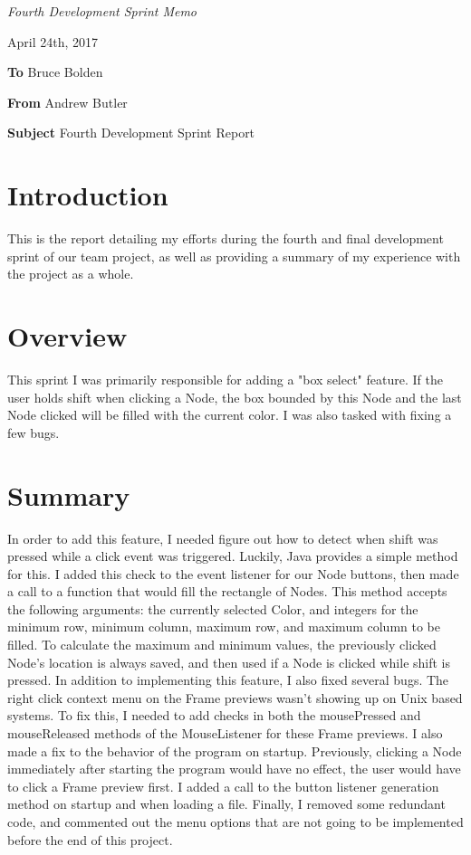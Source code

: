 \documentclass[12pt]{article}
\begin{document}
\noindent \emph {Fourth Development Sprint Memo}

\hfill April 24th, 2017

\noindent \textbf {To} \hspace{32pt}Bruce Bolden

\noindent \textbf {From} \hspace{16pt}Andrew Butler

\noindent \textbf {Subject} \hspace{4pt}Fourth Development Sprint Report

\section*{Introduction}

\hspace{14pt}This is the report detailing my efforts during the fourth and final development sprint of our team project, as well as providing a summary of my experience with the project as a whole.

\section*{Overview}

\hspace{14pt}This sprint I was primarily responsible for adding a "box select" feature. If the user holds shift when clicking a Node, the box bounded by this Node and the last Node clicked will be filled with the current color. I was also tasked with fixing a few bugs.
\section*{Summary}

\hspace{14pt} In order to add this feature, I needed figure out how to detect when shift was pressed while a click event was triggered. Luckily, Java provides a simple method for this. I added this check to the event listener for our Node buttons, then made a call to a function that would fill the rectangle of Nodes. This method accepts the following arguments: the currently selected Color, and integers for the minimum row, minimum column, maximum row, and maximum column to be filled. To calculate the maximum and minimum values, the previously clicked Node's location is always saved, and then used if a Node is clicked while shift is pressed. In addition to implementing this feature, I also fixed several bugs. The right click context menu on the Frame previews wasn't showing up on Unix based systems. To fix this, I needed to add checks in both the mousePressed and mouseReleased methods of the MouseListener for these Frame previews. I also made a fix to the behavior of the program on startup. Previously, clicking a Node immediately after starting the program would have no effect, the user would have to click a Frame preview first. I added a call to the button listener generation method on startup and when loading a file. Finally, I removed some redundant code, and commented out the menu options that are not going to be implemented before the end of this project. 
\linebreak
\end{document}
